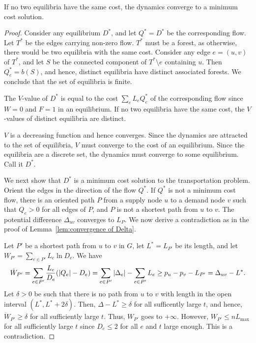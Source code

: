 \documentclass[11pt,a4paper]{article}
\newcommand{\Lmax}{\ensuremath{L_{\mathrm{max}}}}
\begin{document}
\begin{theorem}\label{thm:main transportation} If no two equilibria
have the same cost, the dynamics converge to a minimum
cost solution. 
\end{theorem} 
\begin{proof} Consider any equilibrium $D^*$, and let $Q^* = D^*$ be the
corresponding flow. Let $T^*$ be the edges carrying non-zero flow. $T^*$ must be
a forest, as otherwise, there would be two equilibria with the same
cost. Consider any edge $e = (u,v)$ of $T^*$, and let $S$ be the
connected component of $T^* \setminus e$ containing $u$. Then $Q^*_e = b(S)$, and hence,
distinct equilibria have distinct associated forests. We conclude that the set
of equilibria is finite. 

The $V$-value of $D^*$ is equal to the cost $\sum_e L_e Q^*_e$ of the
corresponding flow since $W = 0$ and $F = 1$ in an equilibrium. If no two
equilibria have the same cost, the $V$-values of distinct equilibria are
distinct. 

$V$ is a decreasing function and hence converges. Since the dynamics are
attracted to the set of equilibria, $V$ must converge to the cost of an
equilibrium. Since the equilibria are a discrete set, the dynamics must
converge to some equilibrium. Call it $D^*$. 

We next show that $D^*$ is a minimum cost solution to the transportation
problem. Orient the edges in the direction of the flow $Q^*$. If $Q^*$ is not a
minimum cost flow, there is an oriented path $P$ from a supply node $u$ to a demand
node $v$ such that $Q_e > 0$ for all edges of $P$, and $P$ is not a shortest
path from $u$ to $v$. The potential difference $\Delta_{uv}$ converges to
$L_P$. We now derive a contradiction as in the proof of
Lemma~\ref{lem:convergence of Delta}. 

Let $P'$ be a shortest path from $u$ to $v$ in $G$, let $L^* = L_{P'}$ be its
length, and let 
$W_{P'} = \sum_{e \in P'} L_e \ln D_e$. 
We have
\[ 
 \dot{W}_{P'} = \sum_{e \in P'} \frac{L_e}{D_e} (| Q_e | - D_e)  = \sum_{e
\in P'} | \Delta_e | - \sum_{e \in P'} L_e \ge p_{u}-p_{v} - L_{P'} =
\Delta_{uv} - L^*.\]
Let $\delta > 0$ be such that there is no path from $u$ to $v$ with length in the
open interval $(L^*, L^* + 2 \delta)$. Then, $\Delta - L^*\ge \delta$
for all sufficently large $t$, and hence, $\dot{W}_{P'} \ge \delta$ for all
sufficiently large $t$. Thus, $W_{P'}$ goes to $+\infty$. However, $W_{P'} \le
n \Lmax$ for all sufficiently large $t$ since $D_e \le 2$ for all $e$ and $t$
large enough. This is a contradiction. 
\end{proof}
\end{document}
